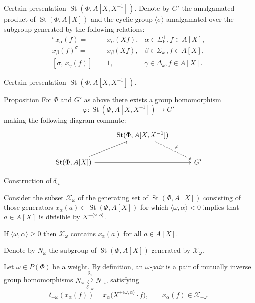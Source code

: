 \documentclass[handout]{beamer} %
\DeclareMathOperator{\St}{St}
\theoremstyle{definition}
\begin{document}
\begin{frame}{Certain presentation $\St(\Phi, A[X, X^{-1}])$.}
Denote by $G'$ the amalgamated product of $\St(\Phi, A[X])$ and the cyclic group $\langle \sigma \rangle$ amalgamated over the subgroup generated by the following relations:
\begin{align}
{}^\sigma x_{\alpha}(f) = & x_{\alpha} (Xf), & \alpha \in \Sigma^+_k, f \in A[X], \label{eq:sigma-sigma-plus} \\
x_{\beta}(f)^ \sigma     =& x_{\beta} (Xf), & \beta \in \Sigma^-_k, f \in A[X], \label{eq:sigma-sigma-minus} \\
[\sigma,\, x_\gamma(f)]   =& 1, & \gamma \in \Delta_k, f \in A[X]. \label{eq:sigma-delta}
\end{align}

\end{frame}

\begin{frame}{Certain presentation $\St(\Phi, A[X, X^{-1}])$.}

\begin{block}{Proposition}
For $\Phi$ and $G'$ as above there exists a group homomorphism
\[
\varphi \colon \St(\Phi,A[X,X^{-1}]) \to G'
\]
making the following diagram commute:
\[
\begin{tikzcd}[ampersand replacement=\&, column sep=2.8em, row sep=2.2em]
\& \St(\Phi,A[X,X^{-1}]) \arrow[rd, dashed, "\varphi"] \& \\
\St(\Phi,A[X]) \arrow[ru] \arrow[rr] \&\& G'
\end{tikzcd}
\]
\end{block}
\end{frame}

\begin{frame}{Construction of $\delta_\varpi$}

Consider the subset $\mathcal{X}_\omega$ of the generating set of $\St(\Phi, A[X])$ consisting of those generators $x_{\alpha}(a) \in \St(\Phi, A[X])$ for which
$\langle \omega, \alpha\rangle < 0$ implies that $a \in A[X]$ is divisible by $X^{-\langle \omega, \alpha\rangle}$.
\pause

If $\langle \omega, \alpha\rangle \geq 0$ then $\mathcal{X}_\omega$ contains $x_\alpha(a)$ for all $a \in A[X]$.
\pause

Denote by $N_{\omega}$ the subgroup of $\St(\Phi, A[X])$ generated by $\mathcal{X}_\omega$.
\pause

Let $\omega \in P(\Phi)$ be a weight. By definition, an \textit{$\omega$-pair} is a pair of mutually inverse group homomorphisms
\( N_\omega \overset{\delta_\omega}{\underset{\delta_{-\omega}}{\rightleftarrows}} N_{-\omega} \) satisfying
\[ \delta_{\pm\omega}(x_\alpha(f)) = x_\alpha\!\bigl(X^{\pm\langle\omega,\alpha\rangle}\cdot f\bigr), \qquad x_\alpha(f)\in \mathcal{X}_{\pm\omega}. \]
\end{frame}
\end{document}
